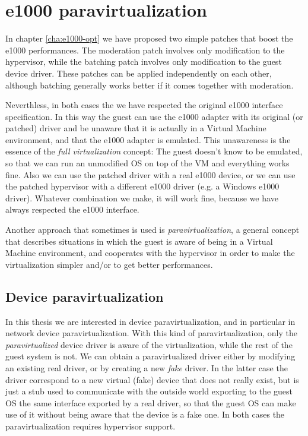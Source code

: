 \chapter{e1000 paravirtualization}
\label{cha:paravirt}
In chapter \ref{cha:e1000-opt} we have proposed two simple patches that boost the e1000 performances.
The moderation patch involves only modification to the hypervisor, while the batching patch involves only modification to the
guest device driver. These patches can be applied independently on each other, although batching generally works better if
it comes together with moderation.

\vspace{0.5cm}

Neverthless, in both cases the we have respected the original e1000 interface specification. In this way the guest can use the e1000 adapter
with its original (or patched) driver and be unaware that it is actually in a Virtual Machine environment, and that the e1000 adapter is
emulated.  This unawareness is the essence of the \emph{full virtualization} concept: The guest doesn't know to be emulated, so
that we can run an unmodified OS on top of the VM and everything works fine.
Also we can use the patched driver with a real e1000 device, or we can use the patched hypervisor with a different e1000 
driver (e.g. a Windows e1000 driver). Whatever combination we make, it will work fine, because we have always respected the e1000 interface.

\vspace{0.5cm}

Another approach that sometimes is used is \emph{paravirtualization}, a general concept that describes situations in which the 
guest is aware of being in a Virtual Machine environment, and cooperates with the hypervisor in order to make the virtualization simpler
and/or to get better performances.


\section{Device paravirtualization}
In this thesis we are interested in device paravirtualization, and in particular in network device paravirtualization.
With this kind of paravirtualization, only the \emph{paravirtualized} device driver is aware of the virtualization, while the rest of the
guest system is not.
We can obtain a paravirtualized driver either by modifying an existing real driver, or by creating a new \emph{fake} driver. In the
latter case the driver correspond to a new virtual (fake) device that does not really exist, but is just a stub used to communicate with 
the outside world exporting to the guest OS the same interface exported by a real driver, so that the guest OS
can make use of it without being aware that the device is a fake one.
In both cases the paravirtualization requires hypervisor support.

